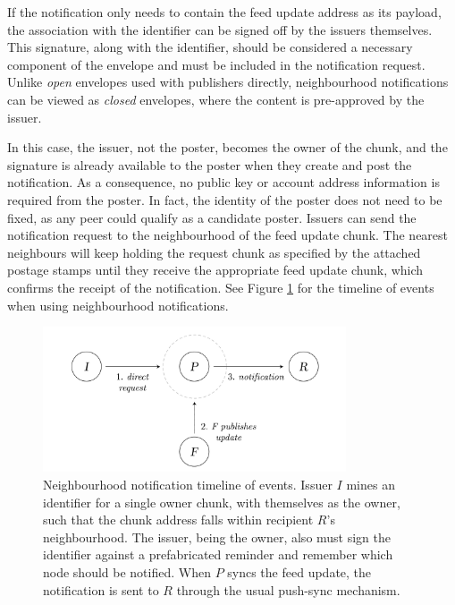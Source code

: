 If the notification only needs to contain the feed update address as its payload, the association with the identifier can be signed off by the issuers themselves. This signature, along with the identifier, should be considered a necessary component of the envelope and must be included in the notification request.
Unlike \emph{open} envelopes used with publishers directly, neighbourhood notifications can be viewed as \emph{closed} envelopes, where the content is pre-approved by the issuer. 

In this case, the issuer, not the poster, becomes the owner of the chunk, and the signature is already available to the poster when they create and post the notification. As a consequence, no public key or account address information is required from the poster. In fact, the identity of the poster does not need to be fixed, as any peer could qualify as a candidate poster. Issuers can send the notification request to the neighbourhood of the feed update chunk. The nearest neighbours will keep holding the request chunk as specified by the attached postage stamps until they receive the appropriate feed update chunk, which confirms the receipt of the notification. See Figure \ref{fig:neighbourhood-notification-events} for the timeline of events when using neighbourhood notifications.

\begin{figure}[htbp]
\centering
\includegraphics[width=0.8\textwidth]{fig/neighbourhood-notification-events.pdf}
\caption[Neighbourhood notification timeline of events \statusgreen]{Neighbourhood notification timeline of events. Issuer $I$ mines an identifier for a single owner chunk, with themselves as the owner, such that the chunk address falls within recipient $R$'s neighbourhood. The issuer, being the owner, also must sign the identifier against a prefabricated reminder and remember which node should be notified. When $P$ syncs the feed update, the notification is sent to $R$ through the usual push-sync mechanism.}
\label{fig:neighbourhood-notification-events}
\end{figure}
  

